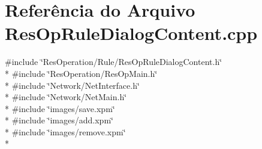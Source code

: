 \section{Referência do Arquivo Res\+Op\+Rule\+Dialog\+Content.\+cpp}
\label{_rule_2_res_op_rule_dialog_content_8cpp}
{\ttfamily \#include \char`\"{}Res\+Operation/\+Rule/\+Res\+Op\+Rule\+Dialog\+Content.\+h\char`\"{}}\\*
{\ttfamily \#include \char`\"{}Res\+Operation/\+Res\+Op\+Main.\+h\char`\"{}}\\*
{\ttfamily \#include \char`\"{}Network/\+Net\+Interface.\+h\char`\"{}}\\*
{\ttfamily \#include \char`\"{}Network/\+Net\+Main.\+h\char`\"{}}\\*
{\ttfamily \#include \char`\"{}images/save.\+xpm\char`\"{}}\\*
{\ttfamily \#include \char`\"{}images/add.\+xpm\char`\"{}}\\*
{\ttfamily \#include \char`\"{}images/remove.\+xpm\char`\"{}}\\*

